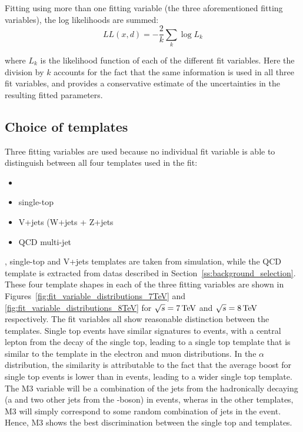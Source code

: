 Fitting using more than one fitting variable (the three aforementioned fitting variables), the log likelihoods
are summed:
\begin{equation}
\label{eq:log_L_final}
LL\left(x, d\right) = -\frac{2}{k} \sum\limits_{k} \log{L_k}
\end{equation}

where $L_k$ is the likelihood function of each of the different fit variables. Here the division by $k$
accounts for the fact that the same information is used in all three fit variables, and provides a
conservative estimate of the uncertainties in the resulting fitted parameters.

\subsection{Choice of templates}
\label{choice_of_templates}

Three fitting variables are used because no individual fit variable is able to distinguish between all four
templates used in the fit:

\begin{itemize}
  \item {\ttbar}
  \item{single-top}
  \item{V+jets (W+jets + Z+jets}
  \item{QCD multi-jet} 
\end{itemize}

\ttbar, single-top and V+jets templates are taken from simulation, while the QCD template is extracted from
datas described in Section~\ref{ss:background_selection}. These four template shapes in each of the three
fitting variables are shown in Figures~\ref{fig:fit_variable_distributions_7TeV} and
\ref{fig:fit_variable_distributions_8TeV} for $\sqrt{s}=7\,\text{Te\hspace{-.08em}V}$ and $\sqrt{s}=8\,\text{Te\hspace{-.08em}V}$ respectively. The fit
variables all show reasonable distinction between the templates. Single top events have similar signatures to
\ttbar events, with a central lepton from the decay of the single top, leading to a single top template that
is similar to the \ttbar template in the electron \abseta and muon \abseta distributions. In the $\alpha$
distribution, the similarity is attributable to the fact that the average boost for single top events is lower
than in \ttbar events, leading to a wider single top template. The M3 variable will be a combination of the
jets from the hadronically decaying \tquark (a \bjet and two other jets from the \W-boson) in \ttbar events,
wheras in the other templates, M3 will simply correspond to some random combination of jets in the event.
Hence, M3 shows the best discrimination between the single top and \ttbar templates.


